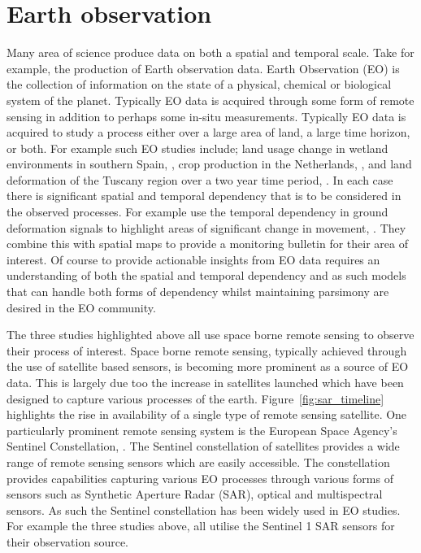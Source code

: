 \section{Earth observation\label{sec:eo}}
Many area of science produce data on both a spatial and temporal scale.
Take for example, the production of Earth observation data. Earth Observation (EO) is the collection of information on the state of a physical, chemical or biological system of the planet.
Typically EO data is acquired through some form of remote sensing in addition to perhaps some in-situ measurements.
Typically EO data is acquired to study a process either over a large area of land, a large time horizon, or both.
For example such EO studies include; land usage change in wetland environments in southern Spain, \citep{muro_short-term_2016}, crop production in the Netherlands, \citep{khabbazan_crop_2019}, and land deformation of the Tuscany region over a two year time period, \citep{raspini_continuous_2018}.
In each case there is significant spatial and temporal dependency that is to be considered in the observed processes.
For example \citeauthor{raspini_continuous_2018} use the temporal dependency in ground deformation signals to highlight areas of significant change in movement, \citep{raspini_continuous_2018}.
They combine this with spatial maps to provide a monitoring bulletin for their area of interest.
Of course to provide actionable insights from EO data requires an understanding of both the spatial and temporal dependency and as such models that can handle both forms of dependency whilst maintaining parsimony are desired in the EO community. 

The three studies highlighted above all use space borne remote sensing to observe their process of interest. 
Space borne remote sensing, typically achieved through the use of satellite based sensors, is becoming more prominent as a source of EO data.
This is largely due too the increase in satellites launched which have been designed to capture various processes of the earth.
Figure~\ref{fig:sar_timeline} highlights the rise in availability of a single type of remote sensing satellite.
One particularly prominent remote sensing system is the European Space Agency's Sentinel Constellation, \cite{aschbacher_european_2012}.
The Sentinel constellation of satellites provides a wide range of remote sensing sensors which are easily accessible.
The constellation provides capabilities capturing various EO processes through various forms of sensors such as Synthetic Aperture Radar (SAR), optical and multispectral sensors.
As such the Sentinel constellation has been widely used in EO studies.
For example the three studies above, \citep{muro_short-term_2016, khabbazan_crop_2019, raspini_continuous_2018}  all utilise the Sentinel 1 SAR sensors for their observation source. 

